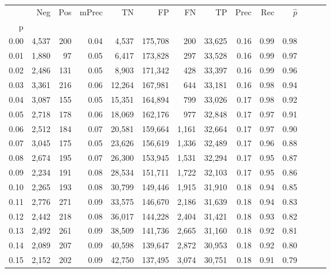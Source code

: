\begin{tabular}{rrrrrrrrrrrrrr}
\toprule
{} &    Neg &  Pos & mPrec &       TN &       FP &      FN &      TP &  Prec &   Rec & $\hat{p}$ \\
p    &        &      &       &          &          &         &         &       &       &           \\
\midrule
0.00 &  4,537 &  200 &  0.04 &    4,537 &  175,708 &     200 &  33,625 &  0.16 &  0.99 &      0.98 \\
0.01 &  1,880 &   97 &  0.05 &    6,417 &  173,828 &     297 &  33,528 &  0.16 &  0.99 &      0.97 \\
0.02 &  2,486 &  131 &  0.05 &    8,903 &  171,342 &     428 &  33,397 &  0.16 &  0.99 &      0.96 \\
0.03 &  3,361 &  216 &  0.06 &   12,264 &  167,981 &     644 &  33,181 &  0.16 &  0.98 &      0.94 \\
0.04 &  3,087 &  155 &  0.05 &   15,351 &  164,894 &     799 &  33,026 &  0.17 &  0.98 &      0.92 \\
0.05 &  2,718 &  178 &  0.06 &   18,069 &  162,176 &     977 &  32,848 &  0.17 &  0.97 &      0.91 \\
0.06 &  2,512 &  184 &  0.07 &   20,581 &  159,664 &   1,161 &  32,664 &  0.17 &  0.97 &      0.90 \\
0.07 &  3,045 &  175 &  0.05 &   23,626 &  156,619 &   1,336 &  32,489 &  0.17 &  0.96 &      0.88 \\
0.08 &  2,674 &  195 &  0.07 &   26,300 &  153,945 &   1,531 &  32,294 &  0.17 &  0.95 &      0.87 \\
0.09 &  2,234 &  191 &  0.08 &   28,534 &  151,711 &   1,722 &  32,103 &  0.17 &  0.95 &      0.86 \\
0.10 &  2,265 &  193 &  0.08 &   30,799 &  149,446 &   1,915 &  31,910 &  0.18 &  0.94 &      0.85 \\
0.11 &  2,776 &  271 &  0.09 &   33,575 &  146,670 &   2,186 &  31,639 &  0.18 &  0.94 &      0.83 \\
0.12 &  2,442 &  218 &  0.08 &   36,017 &  144,228 &   2,404 &  31,421 &  0.18 &  0.93 &      0.82 \\
0.13 &  2,492 &  261 &  0.09 &   38,509 &  141,736 &   2,665 &  31,160 &  0.18 &  0.92 &      0.81 \\
0.14 &  2,089 &  207 &  0.09 &   40,598 &  139,647 &   2,872 &  30,953 &  0.18 &  0.92 &      0.80 \\
0.15 &  2,152 &  202 &  0.09 &   42,750 &  137,495 &   3,074 &  30,751 &  0.18 &  0.91 &      0.79 \\

\end{tabular}
